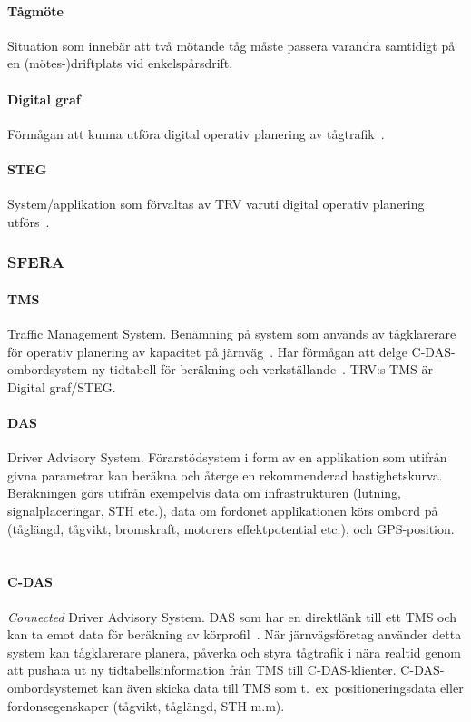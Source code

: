 \paragraph{Tågmöte}
Situation som innebär att två mötande tåg måste passera varandra samtidigt på en (mötes-)driftplats vid enkelspårsdrift.
\paragraph{Digital graf}
Förmågan att kunna utföra digital operativ planering av tågtrafik~\cite{Systemdefinition2019}.
\paragraph{STEG}
System/applikation som förvaltas av TRV varuti digital operativ planering utförs~\cite{Systemdefinition2019}.
\subsubsection{SFERA}
\paragraph{TMS}
Traffic Management System.
Benämning på system som används av tågklarerare för operativ planering av kapacitet på järnväg~\cite{Joborn2023}.
Har förmågan att delge C-DAS-ombordsystem ny tidtabell för beräkning och verkställande~\cite{Joborn2023}.
TRV:s TMS är Digital graf/STEG\@.
\paragraph{DAS}
Driver Advisory System.
Förarstödsystem i form av en applikation som utifrån givna parametrar kan beräkna och återge en rekommenderad hastighetskurva.
Beräkningen görs utifrån exempelvis data om infrastrukturen (lutning, signalplaceringar, STH etc.), data om fordonet applikationen körs ombord på (tåglängd, tågvikt, bromskraft, motorers effektpotential etc.), och GPS-position.
~\cite{Yao2022}
\paragraph{C-DAS}
\emph{Connected} Driver Advisory System.
DAS som har en direktlänk till ett TMS och kan ta emot data för beräkning av körprofil~\cite{Olsson2023}.
När järnvägsföretag använder detta system kan tågklarerare planera, påverka och styra tågtrafik i nära realtid genom att pusha:a ut ny tidtabellsinformation från TMS till C-DAS-klienter.
C-DAS-ombordsystemet kan även skicka data till TMS som t.~ex~positioneringsdata eller fordonsegenskaper (tågvikt, tåglängd, STH m.m).
